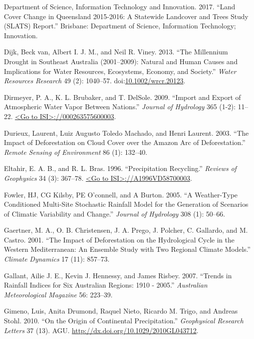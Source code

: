 \documentclass[fleqn,10pt,lineno]{wlpeerj} %
\begin{document}
\hypertarget{ref-SLATS2017}{}
Department of Science, Information Technology and Innovation. 2017.
``Land Cover Change in Queensland 2015-2016: A Statewide Landcover and
Trees Study (SLATS) Report.'' Brisbane: Department of Science,
Information Technology; Innovation.

\hypertarget{ref-vanDijk2013}{}
Dijk, Beck van, Albert I. J. M., and Neil R. Viney. 2013. ``The
Millennium Drought in Southeast Australia (2001--2009): Natural and
Human Causes and Implications for Water Resources, Ecosystems, Economy,
and Society.'' \emph{Water Resources Research} 49 (2): 1040--57.
doi:\href{https://doi.org/10.1002/wrcr.20123}{10.1002/wrcr.20123}.

\hypertarget{ref-Dirmeyer2009}{}
Dirmeyer, P. A., K. L. Brubaker, and T. DelSole. 2009. ``Import and
Export of Atmospheric Water Vapor Between Nations.'' \emph{Journal of
Hydrology} 365 (1-2): 11--22.
\href{\%3CGo\%20to\%20ISI\%3E://000263575600003}{\textless{}Go to ISI\textgreater{}://000263575600003}.

\hypertarget{ref-Durieux2003}{}
Durieux, Laurent, Luiz Augusto Toledo Machado, and Henri Laurent. 2003.
``The Impact of Deforestation on Cloud Cover over the Amazon Arc of
Deforestation.'' \emph{Remote Sensing of Environment} 86 (1): 132--40.

\hypertarget{ref-Eltahir1996}{}
Eltahir, E. A. B., and R. L. Bras. 1996. ``Precipitation Recycling.''
\emph{Reviews of Geophysics} 34 (3): 367--78.
\href{\%3CGo\%20to\%20ISI\%3E://A1996VD58700003}{\textless{}Go to ISI\textgreater{}://A1996VD58700003}.

\hypertarget{ref-Fowler2005}{}
Fowler, HJ, CG Kilsby, PE O'connell, and A Burton. 2005. ``A
Weather-Type Conditioned Multi-Site Stochastic Rainfall Model for the
Generation of Scenarios of Climatic Variability and Change.''
\emph{Journal of Hydrology} 308 (1): 50--66.

\hypertarget{ref-Gaertner2001}{}
Gaertner, M. A., O. B. Christensen, J. A. Prego, J. Polcher, C.
Gallardo, and M. Castro. 2001. ``The Impact of Deforestation on the
Hydrological Cycle in the Western Mediterranean: An Ensemble Study with
Two Regional Climate Models.'' \emph{Climate Dynamics} 17 (11): 857--73.

\hypertarget{ref-Gallant2007}{}
Gallant, Ailie J. E., Kevin J. Hennessy, and James Risbey. 2007.
``Trends in Rainfall Indices for Six Australian Regions: 1910 - 2005.''
\emph{Australian Meteorological Magazine} 56: 223--39.

\hypertarget{ref-Gimeno2010}{}
Gimeno, Luis, Anita Drumond, Raquel Nieto, Ricardo M. Trigo, and Andreas
Stohl. 2010. ``On the Origin of Continental Precipitation.''
\emph{Geophysical Research Letters} 37 (13). AGU.
\url{http://dx.doi.org/10.1029/2010GL043712}.
\end{document}

